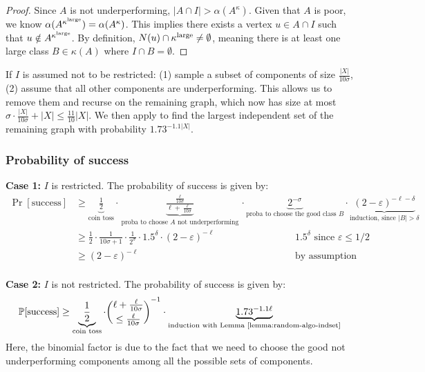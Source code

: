 \begin{proof}
    Since $A$ is not underperforming, $|A \cap I| > \alpha(A^\kappa)$. Given that $A$ is poor, we know $\alpha(A^{\kappa^\text{large}}) = \alpha(A^\kappa)$. This implies there exists a vertex $u \in A \cap I$ such that $u \notin A^{\kappa^\text{large}}$. By definition, $N(u) \cap \kappa^\text{large} \neq \emptyset$, meaning there is at least one large class $B \in \kappa(A)$ where $I \cap B = \emptyset$.
\end{proof}

If $I$ is assumed not to be restricted: (1) sample a subset of components of size $\frac{|X|}{10\sigma}$, (2) assume that all other components are underperforming. This allows us to remove them and recurse on the remaining graph, which now has size at most $\sigma \cdot \frac{|X|}{10 \sigma} + |X| \leq \frac{11}{10}|X|$. We then apply  to find the largest independent set of the remaining graph with probability $1.73^{-1.1|X|}$.

\subsubsection*{Probability of success}

\textbf{Case 1:} $I$ is restricted. The probability of success is given by:
\begin{align*}
    \Pr[\text{success}] &\geq \underbrace{\frac{1}{2}}_{\text{coin toss}} \cdot \underbrace{\frac{\frac{\ell}{10\sigma}}{\ell + \frac{\ell}{10\sigma}}}_{\text{proba to choose $A$ not underperforming}} \cdot \underbrace{2^{-\sigma}}_{\text{proba to choose the good class $B$}} \cdot \underbrace{(2 - \varepsilon)^{-\ell - \delta}}_{\text{induction, since $|B| > \delta$}}\\
    &\geq \frac{1}{2}\cdot \frac{1}{10\sigma + 1}\cdot\frac{1}{2^\sigma}\cdot 1.5^\delta \cdot (2 - \varepsilon)^{-\ell} & \text{$1.5^\delta$ since $\varepsilon \leq 1/2$}\\
    &\geq (2-\varepsilon)^{-\ell} & \text{by assumption (see above)}\\
\end{align*}

\textbf{Case 2:} $I$ is not restricted. The probability of success is given by:
$$\Pr[\text{success}] \geq \underbrace{\frac{1}{2}}_{\text{coin toss}} \cdot \binom{\ell + \frac{\ell}{10\sigma}}{\leq \frac{\ell}{10\sigma}}^{-1} \cdot \underbrace{1.73^{-1.1\ell}}_{\text{induction with \reflemma{lemma:random-algo-indset}}}$$
Here, the binomial factor is due to the fact that we need to choose the good not underperforming components among all the possible sets of components.

